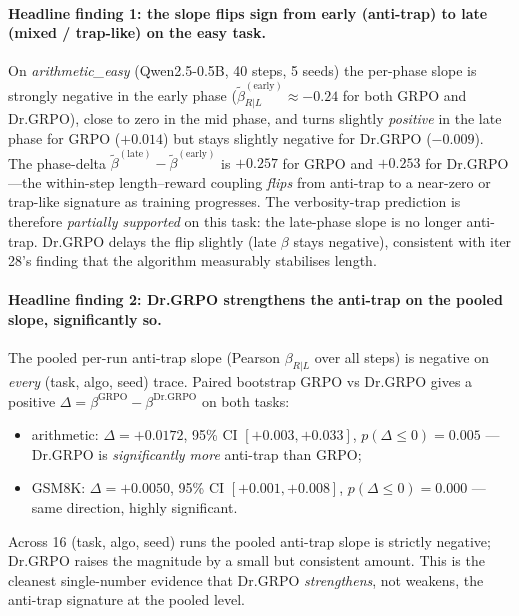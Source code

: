 \paragraph{Headline finding 1: the slope flips sign from early
(anti-trap) to late (mixed / trap-like) on the easy task.}
On \emph{arithmetic\_easy} (Qwen2.5-0.5B, 40 steps, 5 seeds) the
per-phase slope is strongly negative in the early phase
($\tilde\beta_{R|L}^{(\mathrm{early})} \approx -0.24$ for both GRPO
and Dr.GRPO), close to zero in the mid phase, and turns slightly
\emph{positive} in the late phase for GRPO ($+0.014$) but stays
slightly negative for Dr.GRPO ($-0.009$).  The phase-delta
$\tilde\beta^{(\mathrm{late})} - \tilde\beta^{(\mathrm{early})}$ is
$+0.257$ for GRPO and $+0.253$ for Dr.GRPO---the within-step
length--reward coupling \emph{flips} from anti-trap to a near-zero
or trap-like signature as training progresses.  The verbosity-trap
prediction is therefore \emph{partially supported} on this task: the
late-phase slope is no longer anti-trap.  Dr.GRPO delays the flip
slightly (late $\beta$ stays negative), consistent with iter 28's
finding that the algorithm measurably stabilises length.

\paragraph{Headline finding 2: Dr.GRPO strengthens the anti-trap on
the pooled slope, significantly so.}
The pooled per-run anti-trap slope (Pearson $\beta_{R|L}$ over all
steps) is negative on \emph{every} (task, algo, seed) trace.
Paired bootstrap GRPO vs Dr.GRPO gives a positive
$\Delta = \beta^{\mathrm{GRPO}} - \beta^{\mathrm{Dr.GRPO}}$ on both
tasks:
\begin{itemize}
  \item arithmetic: $\Delta = +0.0172$, 95\% CI $[+0.003, +0.033]$,
        $p(\Delta \le 0) = 0.005$ --- Dr.GRPO is \emph{significantly
        more} anti-trap than GRPO;
  \item GSM8K: $\Delta = +0.0050$, 95\% CI $[+0.001, +0.008]$,
        $p(\Delta \le 0) = 0.000$ --- same direction, highly
        significant.
\end{itemize}
Across 16 (task, algo, seed) runs the pooled anti-trap slope is
strictly negative; Dr.GRPO raises the magnitude by a small but
consistent amount.  This is the cleanest single-number evidence that
Dr.GRPO \emph{strengthens}, not weakens, the anti-trap signature at
the pooled level.

